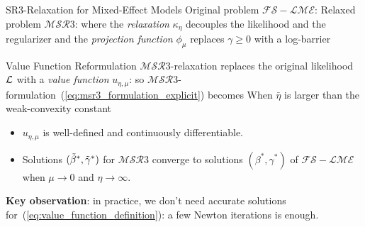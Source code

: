 \documentclass[8pt]{beamer}
\newcommand{\ouralgo}{\ensuremath{\mathcal{MSR}3}}
\begin{document}
\begin{frame}{SR3-Relaxation for Mixed-Effect Models}
Original problem $\mathcal{FS-LME}$:
Relaxed problem $\ouralgo$:
where the \textit{relaxation} $\kappa_\eta$ decouples the likelihood and the regularizer 
and the \textit{projection function} $\phi_\mu$ replaces $\gamma \geq 0$ with a log-barrier 
\end{frame}

\begin{frame}{Value Function Reformulation}
$\ouralgo$-relaxation replaces the original likelihood $\operatorname{\mathcal{L}}$ with a \textit{value function} $u_{\eta,\mu}$:
so $\ouralgo$-formulation~(\ref{eq:msr3_formulation_explicit}) becomes
When $\bar\eta$ is larger than the weak-convexity constant
\begin{itemize}
	\item $u_{\eta,\mu}$ is well-defined and continuously differentiable.
	\item Solutions $(\tilde\beta^*, \tilde\gamma^*)$ for $\ouralgo$ converge to solutions $(\beta^*, \gamma^*)$ of $\mathcal{FS-LME}$ \\ when $\mu \rightarrow 0$ and $\eta \rightarrow \infty$.
\end{itemize}

\textbf{Key observation}: in practice, we don't need accurate solutions for~(\ref{eq:value_function_definition}): a few Newton iterations is enough.
\end{frame}
\end{document}
